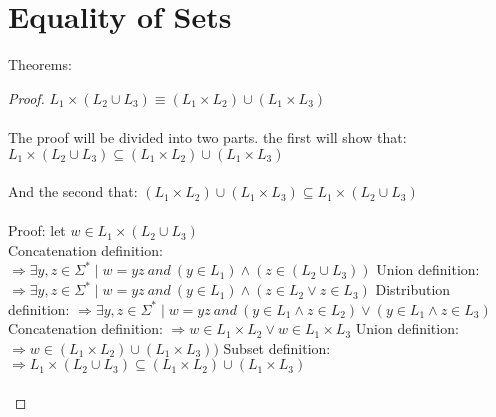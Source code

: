 \documentclass{article}
\begin{document}
\section{Equality of Sets}
Theorems:

\begin{proof}

$L_1 \times (L_2 \cup L_3) \equiv (L_1 \times L_2) \cup (L_1 \times L_3)$
\\
\\
The proof will be divided into two parts. the first will show that: \newline
$L_1 \times (L_2 \cup L_3) \subseteq (L_1 \times L_2) \cup (L_1 \times L_3)$ \newline
\\
\\
And the second that: \newline
$(L_1 \times L_2) \cup (L_1 \times L_3) \subseteq L_1 \times (L_2 \cup L_3)$ \newline
\\
\\
Proof: \newline
let $w \in L_1 \times (L_2 \cup L_3)$ \newline
\\
  Concatenation definition: \newline 
  $\Longrightarrow \exists y,z \in \Sigma^{*} \mid w = yz ~and~ (y \in L_1) \wedge (z \in (L_2 \cup L_3))$ \newline
  Union definition: \newline 
  $\Longrightarrow \exists y,z \in \Sigma^{*} \mid w = yz ~and~ (y \in L_1) \wedge (z \in L_2 \vee z \in L_3)$ \newline
  Distribution definition: \newline
  $\Longrightarrow \exists y,z \in \Sigma^{*} \mid w = yz ~and ~ (y \in L_1 \wedge z \in L_2) \vee (y \in L_1 \wedge z \in L_3)$ \newline
  Concatenation definition: \newline
  $\Longrightarrow w \in L_1 \times L_2 \vee w \in L_1 \times L_3$ \newline
  Union definition: \newline
  $\Longrightarrow w \in (L_1 \times L_2) \cup (L_1 \times L_3))$ \newline
  Subset definition: \newline 
  $\Longrightarrow L_1 \times (L_2 \cup L_3) \subseteq (L_1 \times L_2) \cup (L_1 \times L_3)$
  \\
  \\

\end{proof}
\end{document}
